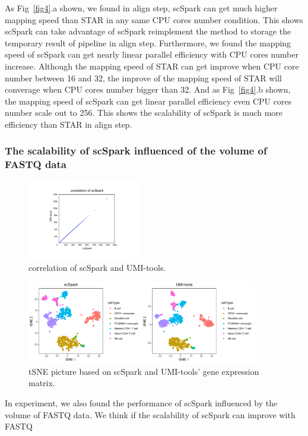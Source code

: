 \documentclass[conference]{IEEEtran}
\begin{document}
As Fig~\ref{fig4}.a shown, we found in align step, scSpark can get much higher mapping speed than STAR in any same CPU cores number condition.
This shows scSpark can take advantage of scSpark reimplement the method to storage the temporary result of pipeline in align step.
Furthermore, we found the mapping speed of scSpark can get nearly linear parallel efficiency with CPU cores number increase.
Although the mapping speed of STAR can get improve when CPU core number between 16 and 32, the improve of the mapping speed of STAR will converage when CPU cores number bigger than 32.
And as Fig~\ref{fig4}.b shown, the mapping speed of scSpark can get linear parallel efficiency even CPU cores number scale out to 256.
This shows the scalability of scSpark is much more efficiency than STAR in align step.

\subsubsection{The scalability of scSpark influenced of the volume of FASTQ data}
\begin{figure}
	\centering
	\includegraphics[width=0.45\textwidth]{fig6.pdf}
	\caption{correlation of scSpark and UMI-tools.} \label{fig6}
\end{figure}
\begin{figure}
	\centering
	\includegraphics[width=0.9\textwidth]{fig7.pdf}
	\caption{tSNE picture based on scSpark and UMI-tools' gene expression matrix.} \label{fig7}
\end{figure}
In experiment, we also found the performance of scSpark influenced by the volume of FASTQ data.
We think if the scalability of scSpark can improve with FASTQ
\end{document}
